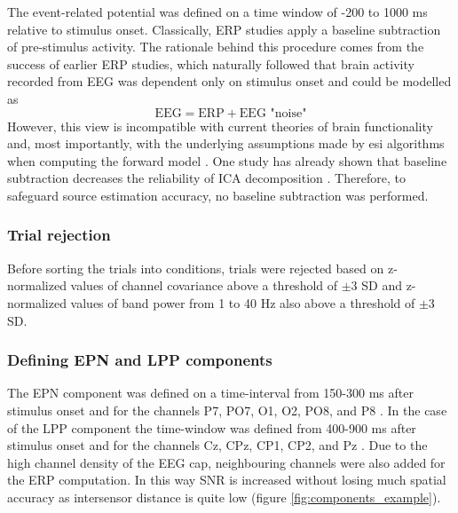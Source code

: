 The event-related potential was defined on a time window of -200 to 1000 ms relative to stimulus onset. Classically, ERP studies apply a baseline subtraction of pre-stimulus activity. The rationale behind this procedure comes from the success of earlier ERP studies, which naturally followed that brain activity recorded from EEG was dependent only on stimulus onset and could be modelled as \begin{equation}
\text{EEG} = \text{ERP} + \text{EEG "noise"}
\end{equation}
However, this view is incompatible with current theories of brain functionality and, most importantly, with the underlying assumptions made by \acrshort{esi} algorithms when computing the forward model \cite{delormeWhatBestERP2023, delormeEEGBetterLeft2023}. One study has already shown that baseline subtraction decreases the reliability of ICA decomposition \cite{groppeIdentifyingReliableIndependent2009}. Therefore, to safeguard source estimation accuracy, no baseline subtraction was performed.

\subsubsection{Trial rejection}

Before sorting the trials into conditions, trials were rejected based on z-normalized values of channel covariance above a threshold of $\pm 3$ SD \cite{cohenAnalyzingNeuralTime2014} and z-normalized values of band power from 1 to 40 Hz also above a threshold of $\pm 3$ SD.

\subsubsection{Defining EPN and LPP components}

The EPN component was defined on a time-interval from 150-300 ms after stimulus onset and for the channels P7, PO7, O1, O2, PO8, and P8 \cite{junghoferFleetingImagesNew2001, farkasEmotionalFeaturebasedModulation2020}. In the case of the LPP component the time-window was defined from 400-900 ms after stimulus onset and for the channels Cz, CPz, CP1, CP2, and Pz \cite{hajcakEventRelatedPotentialsEmotion2010, farkasEmotionalFeaturebasedModulation2020}. Due to the high channel density of the EEG cap, neighbouring channels were also added for the ERP computation. In this way SNR is increased without losing much spatial accuracy as intersensor distance is quite low \cite{luuHydroCelGSN102005} (figure \ref{fig:components_example}).

